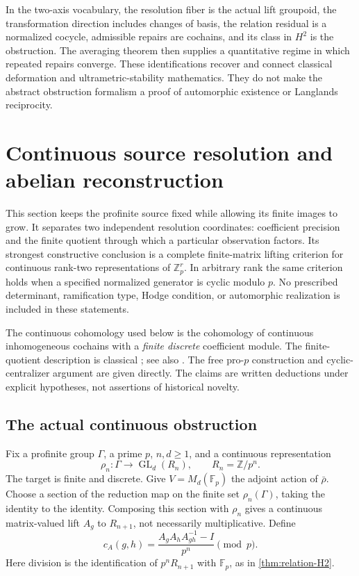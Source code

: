 \documentclass[11pt]{article}
\theoremstyle{definition}
\theoremstyle{remark}
\begin{document}
In the two-axis vocabulary, the resolution fiber is the actual lift groupoid, the transformation direction includes changes of basis, the relation residual is a normalized cocycle, admissible repairs are cochains, and its class in $H^2$ is the obstruction. The averaging theorem then supplies a quantitative regime in which repeated repairs converge. These identifications recover and connect classical deformation and ultrametric-stability mathematics. They do not make the abstract obstruction formalism a proof of automorphic existence or Langlands reciprocity.


\section{Continuous source resolution and abelian reconstruction}\label{sec:profinite-reconstruction}

This section keeps the profinite source fixed while allowing its finite images to grow. It separates two independent resolution coordinates: coefficient precision and the finite quotient through which a particular observation factors. Its strongest constructive conclusion is a complete finite-matrix lifting criterion for continuous rank-two representations of $\mathbb Z_p^r$. In arbitrary rank the same criterion holds when a specified normalized generator is cyclic modulo $p$. No prescribed determinant, ramification type, Hodge condition, or automorphic realization is included in these statements.

The continuous cohomology used below is the cohomology of continuous inhomogeneous cochains with a \emph{finite discrete} coefficient module. The finite-quotient description is classical \cite[Chapter II, Section 4, Proposition 4.2]{MilneCFT2020}; see also \cite{StacksContinuous}. The free pro-$p$ construction and cyclic-centralizer argument are given directly. The claims are written deductions under explicit hypotheses, not assertions of historical novelty.

\subsection{The actual continuous obstruction}

Fix a profinite group $\Gamma$, a prime $p$, $n,d\geq1$, and a continuous representation
\[
 \rho_n:\Gamma\longrightarrow\operatorname{GL}_d(R_n),
 \qquad R_n=\mathbb Z/p^n.
\]
The target is finite and discrete. Give $V=M_d(\mathbb F_p)$ the adjoint action of $\bar\rho$. Choose a section of the reduction map on the finite set $\rho_n(\Gamma)$, taking the identity to the identity. Composing this section with $\rho_n$ gives a continuous matrix-valued lift $A_g$ to $R_{n+1}$, not necessarily multiplicative. Define
\[
 c_A(g,h)=\frac{A_gA_hA_{gh}^{-1}-I}{p^n}\pmod p.
\]
Here division is the identification of $p^nR_{n+1}$ with $\mathbb F_p$, as in \cref{thm:relation-H2}.
\end{document}
